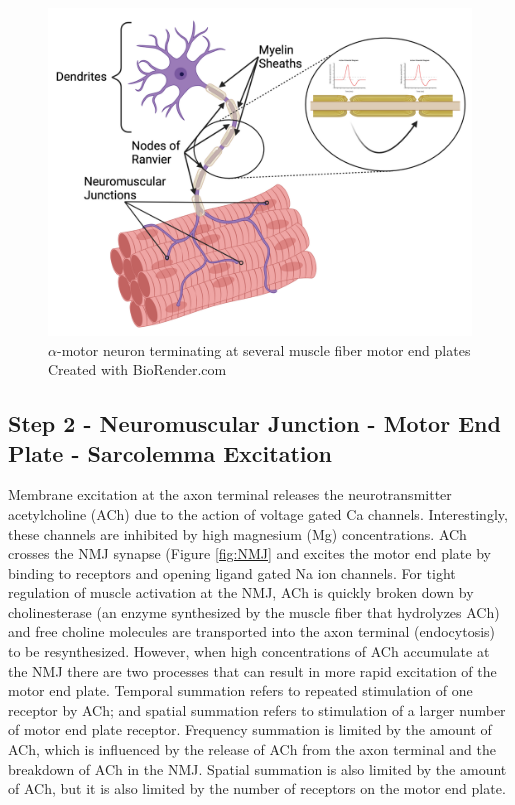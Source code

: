 \begin{figure}[!ht]
    \centering
    \includegraphics[width=1\linewidth]{./figure/Motoneuron.png}
    \caption{$\alpha$-motor neuron terminating at several muscle fiber motor end plates \footnotesize{Created with BioRender.com}}
    \label{fig:Motoneuron}
\end{figure}

\subsection{Step 2 - Neuromuscular Junction - Motor End Plate - Sarcolemma Excitation}

Membrane excitation at the axon terminal releases the neurotransmitter acetylcholine (ACh) due to the action of voltage gated Ca channels. Interestingly, these channels are inhibited by high magnesium (Mg) concentrations. ACh crosses the NMJ synapse (Figure \ref{fig:NMJ} and excites the motor end plate by binding to receptors and opening ligand gated Na ion channels. For tight regulation of muscle activation at the NMJ, ACh is quickly broken down by cholinesterase (an enzyme synthesized by the muscle fiber that hydrolyzes ACh) and free choline molecules are transported into the axon terminal (endocytosis) to be resynthesized. However, when high concentrations of ACh accumulate at the NMJ there are two processes that can result in more rapid excitation of the motor end plate. Temporal summation refers to repeated stimulation of one receptor by ACh; and spatial summation refers to stimulation of a larger number of motor end plate receptor. Frequency summation is limited by the amount of ACh, which is influenced by the release of ACh from the axon terminal and the breakdown of ACh in the NMJ. Spatial summation is also limited by the amount of ACh, but it is also limited by the number of receptors on the motor end plate.

